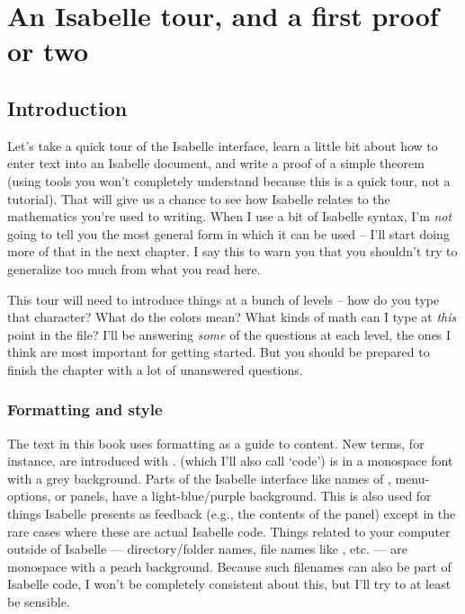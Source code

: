 \chapter{An Isabelle tour, and a first proof or two}


\section{Introduction}
Let's take a quick tour of the Isabelle interface, learn a little bit about how to enter text into an Isabelle document, and write a proof of a simple theorem (using tools you won't completely understand because this is a quick tour, not a tutorial). That will give us a chance to see how Isabelle relates to the mathematics you're used to writing. When I use a bit of Isabelle syntax, I'm \textit{not} going to tell you the most general form in which it can be used -- I'll start doing more of that in the next chapter. I say this to warn you that you shouldn't try to generalize too much from what you read here. 
 
This tour will need to introduce things at a bunch of levels -- how do you type that character? What do the colors mean? What kinds of math can I type at \textit{this} point in the file? I'll be answering \textit{some} of the questions at each level, the ones I think are most important for getting started. But you should be prepared to finish the chapter with a lot of unanswered questions.

\subsection{Formatting and style}
The text in this book uses formatting as a guide to content. New terms, for instance, are introduced with .  (which I'll also call `code') is in a monospace font with a grey background. Parts of the Isabelle interface like names of , menu-options, or panels, have a light-blue/purple background. This is also used for things Isabelle presents as feedback (e.g., the contents of the  panel) except in the rare cases where these are actual Isabelle code. Things related to your computer outside of Isabelle --- directory/folder names, file names like , etc. --- are monospace with a peach background. Because such filenames can also be part of Isabelle code, I won't be completely consistent about this, but I'll try to at least be sensible.

